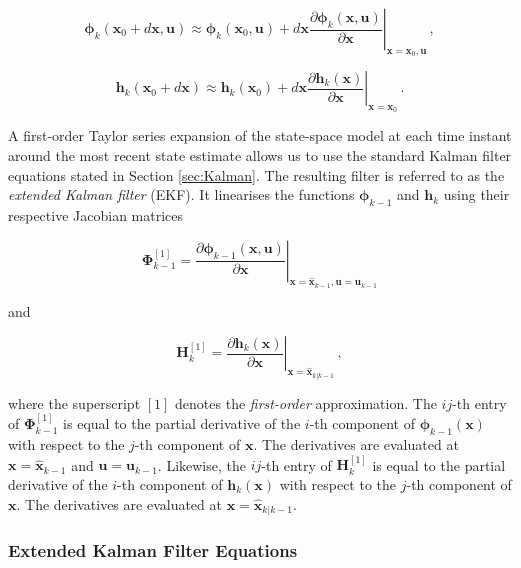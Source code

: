 \begin{equation}\label{eq:linear_phi}
  \bm{\phi}_{k}(\bm{x}_0 + d \bm{x}, \bm{u}) \approx \bm{\phi}_{k}(\bm{x}_0, \bm{u}) + d \bm{x} \left. \frac{\partial \bm{\phi}_{k}(\bm{x}, \bm{u})}{\partial \bm{x}} \right|_{\bm{x} = \bm{x}_0, \bm{u}}\,,
\end{equation}

\begin{equation}\label{eq:linear_h}
  \bm{h}_{k}(\bm{x}_0 + d \bm{x}) \approx \bm{h}_{k}(\bm{x}_0) + d \bm{x} \left. \frac{\partial \bm{h}_{k}(\bm{x})}{\partial \bm{x}} \right|_{\bm{x} = \bm{x}_0}\,.
\end{equation}

\noindent
A first-order Taylor series expansion of the state-space model at each time instant around the most recent state estimate allows us to use the standard Kalman filter equations stated in Section \ref{sec:Kalman}. The resulting filter is referred to as the \emph{extended Kalman filter} (EKF). It linearises the functions $\bm{\phi}_{k-1}$ and $\bm{h}_k$ using their respective Jacobian matrices  

\begin{equation}\label{eq:Phi_first_order}
  \bm{\Phi}^{[1]}_{k-1} =  \left. \frac{\partial \bm{\phi}_{k-1}(\bm{x}, \bm{u})}{\partial \bm{x}} \right|_{\bm{x}=\hat{\bm{x}}_{k-1}, \bm{u} = \bm{u}_{k-1}}
\end{equation}

\noindent
and

\begin{equation}\label{eq:H_first_order}
  \bm{H}^{[1]}_{k} = \left. \frac{\partial \bm{h}_{k}(\bm{x})}{\partial \bm{x}} \right|_{\bm{x}=\hat{\bm{x}}_{k|k-1}} \,,
\end{equation}

\noindent
where the superscript ${[1]}$ denotes the \emph{first-order} approximation. The $ij$-th entry of $\bm{\Phi}^{[1]}_{k-1}$ is equal to the partial derivative of the $i$-th component of $\bm{\phi}_{k-1}(\bm{x})$ with respect to the $j$-th component of $\bm{x}$. The derivatives are evaluated at $\bm{x}=\hat{\bm{x}}_{k-1}$ and $\bm{u} = \bm{u}_{k-1}$. Likewise, the $ij$-th entry of $\bm{H}^{[1]}_{k}$ is equal to the partial derivative of the $i$-th component of $\bm{h}_{k}(\bm{x})$ with respect to the $j$-th component of $\bm{x}$. The derivatives are evaluated at $\bm{x}=\hat{\bm{x}}_{k|k-1}$.


 \subsubsection{Extended Kalman Filter Equations}
 
